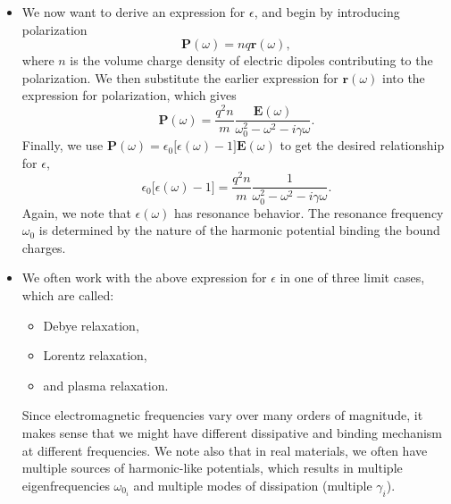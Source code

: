 \documentclass[11pt, a4paper]{article}
\renewcommand{\vec}[1]{\bm{#1}} %
\renewcommand{\r}{\vec{r}}
\newcommand{\E}{\vec{E}} %
\renewcommand{\P}{\vec{P}}  %
\newcommand{\ee}{\epsilon_{0}}  %
\begin{document}
\begin{itemize}
    \item We now want to derive an expression for $ \epsilon $, and begin by introducing polarization
    \begin{equation*}
        \P(\omega) = nq\r(\omega),
    \end{equation*}
    where $ n $ is the volume charge density of electric dipoles contributing to the polarization. We then substitute the earlier expression for $ \r(\omega) $ into the expression for polarization, which gives
    \begin{equation*}
        \P(\omega) = \frac{q^{2}n}{m} \frac{\E(\omega)}{\omega_{0}^{2} - \omega^{2} - i \gamma \omega}.
    \end{equation*}
    Finally, we use $ \P(\omega) = \ee \big[ \epsilon(\omega)-1 \big]\E(\omega) $ to get the desired relationship for $ \epsilon $,
    \begin{equation*}
        \ee \big[ \epsilon(\omega) -1 \big] = \frac{q^{2}n}{m} \frac{1}{\omega_{0}^{2} - \omega^{2} - i\gamma\omega}. 
    \end{equation*}
    Again, we note that $ \epsilon(\omega) $ has resonance behavior. The resonance frequency $ \omega_{0} $ is determined by the nature of the harmonic potential binding the bound charges.
    
    \item We often work with the above expression for $ \epsilon $ in one of three limit cases, which are called:
    \begin{itemize}
        \item Debye relaxation,

        \item Lorentz relaxation,

        \item and plasma relaxation.
    \end{itemize}
    Since electromagnetic frequencies vary over many orders of magnitude, it makes sense that we might have different dissipative and binding mechanism at different frequencies. We note also that in real materials, we often have multiple sources of harmonic-like potentials, which results in multiple eigenfrequencies $ \omega_{0_{i}} $ and multiple modes of dissipation (multiple $ \gamma_{i} $).

    
\end{itemize}
\end{document}
